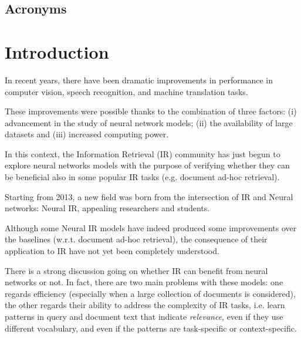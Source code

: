 \newpage
\begin{center}
\section*{Acronyms}
\begin{acronym}
\end{acronym}
\end{center}

\newpage
\chapter{Introduction}

In recent years, there have been dramatic improvements in performance in computer vision, speech recognition, and machine translation tasks.

These improvements were possible thanks to the combination of three factors: (i) advancement in the study of neural network models; (ii) the availability of large datasets and (iii) increased computing power.

In this context, the Information Retrieval (IR) community has just begun to explore neural networks models with the purpose of verifying whether they can be beneficial also in some popular IR tasks (e.g. document ad-hoc retrieval).

Starting from 2013, a new field was born from the intersection of IR and Neural networks: Neural IR, appealing researchers and students.

Although some Neural IR models have indeed produced some improvements over the baselines (w.r.t. document ad-hoc retrieval), the consequence of their application to IR have not yet been completely understood.

There is a strong discussion going on whether IR can benefit from neural networks or not. In fact, there are two main problems with these models: one regards
efficiency (especially when a large collection of documents is considered), the other regards their ability to address the complexity
of IR tasks, i.e. learn patterns in query and document text that indicate \textit{relevance}, even if they use different
vocabulary, and even if the patterns are task-specific or context-specific.

